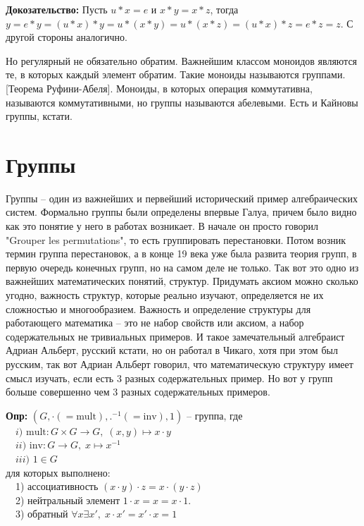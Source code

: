 \textbf{Докозательство:} Пусть $u*x=e$ и $x*y=x*z$, тогда $y=e*y=(u*x)*y=u*(x*y)=
u*(x*z)=(u*x)*z=e*z=z$. С другой стороны аналогично.

Но регулярный не обязательно обратим. Важнейшим классом моноидов являются те,
в которых каждый элемент обратим. Такие моноиды называются группами. [Теорема
Руфини-Абеля]. Моноиды, в которых операция коммутативна, называются
коммутативными, но группы называются абелевыми. Есть и Кайновы группы, кстати.

\section{Группы}
Группы – один из важнейших и первейший исторический пример алгебраических
систем. Формально группы были определены впервые Галуа, причем было видно как
это понятие у него в работах возникает. В начале он просто говорил "Grouper
les permutations", то есть группировать перестановки. Потом возник термин группа
перестановок, а в конце 19 века уже была развита теория групп, в первую очередь
конечных групп, но на самом деле не только. Так вот это одно из важнейших
математических понятий, структур. Придумать аксиом можно сколько угодно,
важность структур, которые реально изучают,  определяется не их сложностью и
многообразием. Важность и определение структуры для работающего математика –
это не набор свойств или аксиом, а набор содержательных не тривиальных примеров.
И такое замечательный алгебраист Адриан Альберт, русский кстати, но он работал
в Чикаго, хотя при этом был русским, так вот Адриан Альберт говорил, что
математическую структуру имеет смысл изучать, если есть 3 разных содержательных
пример. Но вот у групп больше совершенно чем 3 разных содержательных примеров.

\textbf{Опр:} $(G,\cdot(=\text{mult}),.^{-1}(=\text{inv}),1)$ – группа, где\\
$\quad i)$ $\text{mult}: G\times G \longrightarrow G,\;(x,y)\mapsto x\cdot y$\\
$\quad ii)$ $\text{inv}: G\longrightarrow G,\;x\mapsto x^{-1}$\\
$\quad iii)$ $1\in G$\\
для которых выполнено:\\
$\quad$1) ассоциативность $(x\cdot y)\cdot z=x\cdot (y\cdot z)$\\
$\quad$2) нейтральный элемент $1\cdot x = x = x\cdot 1$.\\
$\quad$3) обратный $\forall x\exists x',\;x\cdot x' = x'\cdot x = 1$


